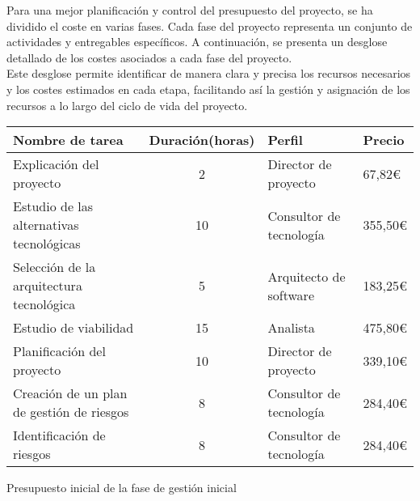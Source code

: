Para una mejor planificación y control del presupuesto del proyecto, se ha dividido el coste en varias fases.
Cada fase del proyecto representa un conjunto de actividades y entregables específicos.
A continuación, se presenta un desglose detallado de los costes asociados a cada fase del proyecto.
\\[1ex]
Este desglose permite identificar de manera clara y precisa los recursos necesarios y los costes estimados en cada etapa, facilitando así la gestión y asignación de los recursos a lo largo del ciclo de vida del proyecto.
\begin{planificacion}
	\centering
	\begin{tabular}{ | m{8.5cm} | c | m{2.5cm} |  m{1.5cm} |}
		\hline
		\textbf{Nombre de tarea}                  & \textbf{Duración(horas)} & \textbf{Perfil}         & \textbf{Precio} \\\hline
		Explicación del proyecto                  & 2                        & Director de proyecto    & 67,82€          \\\hline
		Estudio de las alternativas tecnológicas  & 10                       & Consultor de tecnología & 355,50€         \\\hline
		Selección de la arquitectura tecnológica  & 5                        & Arquitecto de software  & 183,25€         \\\hline
		Estudio de viabilidad                     & 15                       & Analista                & 475,80€         \\\hline
		Planificación del proyecto                & 10                       & Director de proyecto    & 339,10€         \\\hline
		Creación de un plan de gestión de riesgos & 8                        & Consultor de tecnología & 284,40€         \\\hline
		Identificación de riesgos                 & 8                        & Consultor de tecnología & 284,40€         \\\hline
	\end{tabular}
	\caption{Presupuesto inicial de la fase de gestión inicial}
\end{planificacion}

